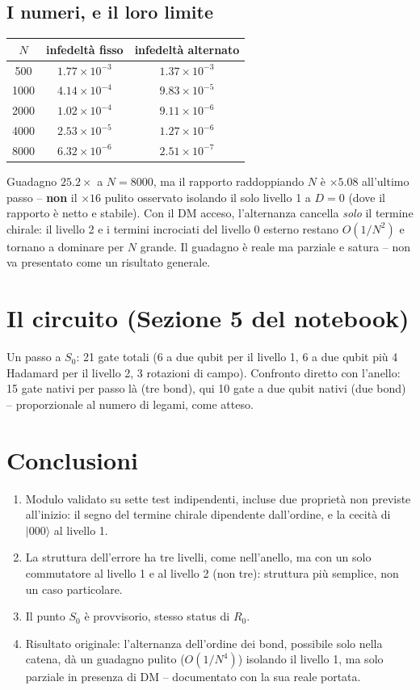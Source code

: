 \documentclass[11pt,a4paper]{article}
\newcommand{\ket}[1]{\lvert #1 \rangle}
\begin{document}
\subsection{I numeri, e il loro limite}

\begin{center}
\begin{tabular}{@{}ccc@{}}
\toprule
$N$ & infedeltà fisso & infedeltà alternato \\
\midrule
500 & $1.77\times10^{-3}$ & $1.37\times10^{-3}$ \\
1000 & $4.14\times10^{-4}$ & $9.83\times10^{-5}$ \\
2000 & $1.02\times10^{-4}$ & $9.11\times10^{-6}$ \\
4000 & $2.53\times10^{-5}$ & $1.27\times10^{-6}$ \\
8000 & $6.32\times10^{-6}$ & $2.51\times10^{-7}$ \\
\bottomrule
\end{tabular}
\end{center}
Guadagno $25.2\times$ a $N=8000$, ma il rapporto raddoppiando $N$ è $\times5.08$ all'ultimo passo -- \textbf{non} il $\times16$ pulito osservato isolando il solo livello 1 a $D=0$ (dove il rapporto è netto e stabile). Con il DM acceso, l'alternanza cancella \emph{solo} il termine chirale: il livello 2 e i termini incrociati del livello 0 esterno restano $O(1/N^2)$ e tornano a dominare per $N$ grande. Il guadagno è reale ma parziale e satura -- non va presentato come un risultato generale.

\section{Il circuito (Sezione 5 del notebook)}

Un passo a $S_0$: 21 gate totali (6 a due qubit per il livello 1, 6 a due qubit più 4 Hadamard per il livello 2, 3 rotazioni di campo). Confronto diretto con l'anello: 15 gate nativi per passo là (tre bond), qui 10 gate a due qubit nativi (due bond) -- proporzionale al numero di legami, come atteso.

\section{Conclusioni}

\begin{enumerate}
\item Modulo validato su sette test indipendenti, incluse due proprietà non previste all'inizio: il segno del termine chirale dipendente dall'ordine, e la cecità di $\ket{000}$ al livello 1.
\item La struttura dell'errore ha tre livelli, come nell'anello, ma con un solo commutatore al livello 1 e al livello 2 (non tre): struttura più semplice, non un caso particolare.
\item Il punto $S_0$ è provvisorio, stesso status di $R_0$.
\item Risultato originale: l'alternanza dell'ordine dei bond, possibile solo nella catena, dà un guadagno pulito ($O(1/N^4)$) isolando il livello 1, ma solo parziale in presenza di DM -- documentato con la sua reale portata.
\end{enumerate}
\end{document}
